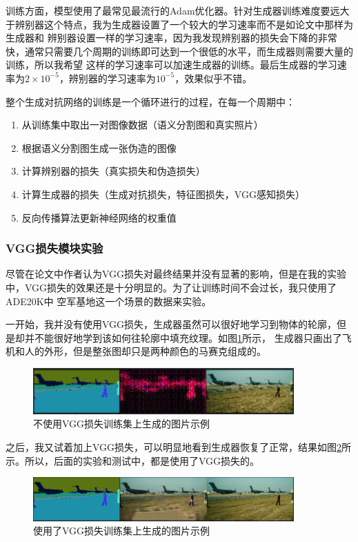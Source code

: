 \documentclass[supercite]{HustGraduPaper}
\theoremstyle{definition}
\begin{document}
训练方面，模型使用了最常见最流行的Adam优化器。针对生成器训练难度要远大于辨别器这个特点，我为生成器设置了一个较大的学习速率而不是如论文中那样为生成器和
辨别器设置一样的学习速率，因为我发现辨别器的损失会下降的非常快，通常只需要几个周期的训练即可达到一个很低的水平，而生成器则需要大量的训练，所以我希望
这样的学习速率可以加速生成器的训练。最后生成器的学习速率为$2\times10^{-5}$，辨别器的学习速率为$10^{-5}$，效果似乎不错。

整个生成对抗网络的训练是一个循环进行的过程，在每一个周期中：
\begin{enumerate}
  \item 从训练集中取出一对图像数据（语义分割图和真实照片）
  \item 根据语义分割图生成一张伪造的图像
  \item 计算辨别器的损失（真实损失和伪造损失）
  \item 计算生成器的损失（生成对抗损失，特征图损失，VGG感知损失）
  \item 反向传播算法更新神经网络的权重值
\end{enumerate}

\subsubsection{VGG损失模块实验}

尽管在论文中作者认为VGG损失对最终结果并没有显著的影响，但是在我的实验中，VGG损失的效果还是十分明显的。为了让训练时间不会过长，我只使用了ADE20K中
空军基地这一个场景的数据来实验。

一开始，我并没有使用VGG损失，生成器虽然可以很好地学习到物体的轮廓，但是却并不能很好地学到该如何往轮廓中填充纹理。如图\ref{fig:without-VGG}所示，
生成器只画出了飞机和人的外形，但是整张图却只是两种颜色的马赛克组成的。
\begin{figure}[H]
  \begin{center}
  \includegraphics[width=10cm]{images/without-VGG}
  \end{center}
  \caption{不使用VGG损失训练集上生成的图片示例}
  \label{fig:without-VGG}
\end{figure}

之后，我又试着加上VGG损失，可以明显地看到生成器恢复了正常，结果如图\ref{fig:with-VGG}所示。所以，后面的实验和测试中，都是使用了VGG损失的。
\begin{figure}[H]
  \begin{center}
  \includegraphics[width=10cm]{images/with-VGG}
  \end{center}
  \caption{使用了VGG损失训练集上生成的图片示例}
  \label{fig:with-VGG}
\end{figure}
\end{document}
